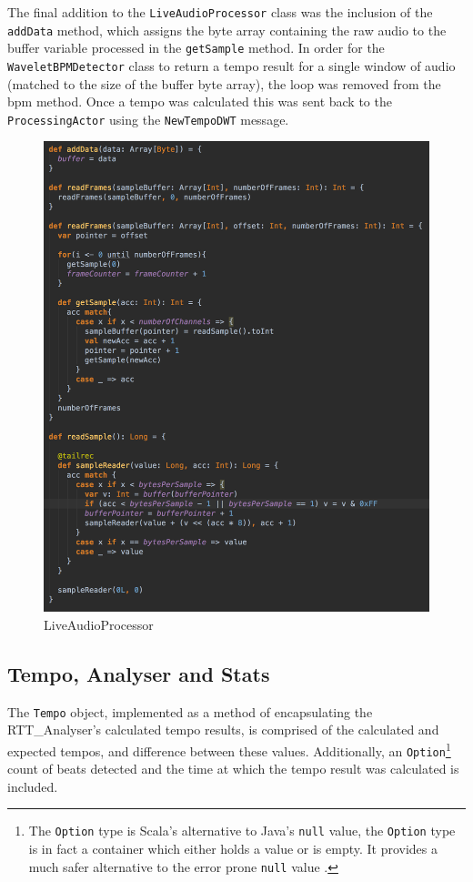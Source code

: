 \documentclass[a4paper, 11pt]{article}
\begin{document}
The final addition to the \texttt{LiveAudioProcessor} class was the inclusion of the \texttt{addData} method, which assigns the byte array containing the raw audio to the buffer variable processed in the \texttt{getSample} method. In order for the \texttt{WaveletBPMDetector} class to return a tempo result for a single window of audio (matched to the size of the buffer byte array), the loop was removed from the bpm method. Once a tempo was calculated this was sent back to the \texttt{ProcessingActor} using the \texttt{NewTempoDWT} message.

\begin{figure}[h]
	\centering
	\includegraphics[scale=0.25]{images/liveAudioPro.jpg}
	\caption{LiveAudioProcessor}
	\label{fig: liveAudPro}
\end{figure}
\clearpage

\subsection{Tempo, Analyser and Stats}
The \texttt{Tempo} object, implemented as a method of encapsulating the RTT\_Analyser's calculated tempo results, is comprised of the calculated and expected tempos, and difference between these values. Additionally, an \texttt{Option}\footnote{The \texttt{Option} type is Scala's alternative to Java's \texttt{null} value, the \texttt{Option} type is in fact a container which either holds a value or is empty. It provides a much safer alternative to the error prone \texttt{null} value \cite{mariusEr}.} count of beats detected and the time at which the tempo result was calculated is included.\par 
\end{document}

